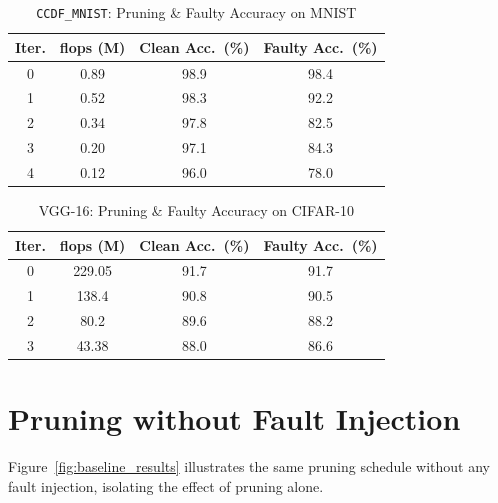 \begin{table}[H]
  \centering
  \caption{\texttt{CCDF\_MNIST}: Pruning \& Faulty Accuracy on MNIST}
  \label{tab:ccdf_faulty}
  \begin{tabular}{c|c|c|c}
    \toprule
    \textbf{Iter.} & \textbf{\gls{flops} (M)} & \textbf{Clean Acc.\ (\%)} & \textbf{Faulty Acc.\ (\%)} \\
    \midrule
    0 & 0.89 & 98.9 & 98.4 \\
    1 & 0.52 & 98.3 & 92.2 \\
    2 & 0.34 & 97.8 & 82.5 \\
    3 & 0.20 & 97.1 & 84.3 \\
    4 & 0.12 & 96.0 & 78.0 \\
    \bottomrule
  \end{tabular}
\end{table}

\begin{table}[H]
  \centering
  \caption{VGG-16: Pruning \& Faulty Accuracy on CIFAR-10}
  \label{tab:vgg_faulty}
  \begin{tabular}{c|c|c|c}
    \toprule
    \textbf{Iter.} & \textbf{\gls{flops} (M)} & \textbf{Clean Acc.\ (\%)} & \textbf{Faulty Acc.\ (\%)} \\
    \midrule
    0 &  229.05& 91.7 & 91.7 \\
    1 &  138.4 & 90.8 & 90.5 \\
    2 &  80.2  & 89.6 & 88.2 \\
    3 &  43.38 & 88.0 & 86.6 \\
    \bottomrule
  \end{tabular}
\end{table}

\section{Pruning without Fault Injection}
\label{sec:results_no_fault}

Figure~\ref{fig:baseline_results} illustrates the same pruning schedule without any fault injection, isolating the effect of pruning alone.

